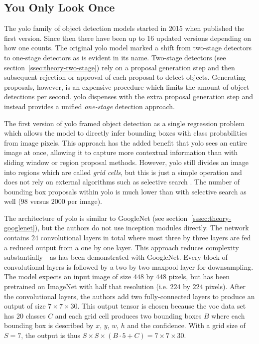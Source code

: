 \documentclass[draft,final]{vutinfth} %
\begin{document}
\subsection{You Only Look Once}
\label{sec:methods-detection}

The \gls{yolo} family of object detection models started in 2015 when
\cite{redmon2016} published the first version. Since then there have
been up to 16 updated versions depending on how one counts. The
original \gls{yolo} model marked a shift from two-stage detectors to
one-stage detectors as is evident in its name. Two-stage detectors
(see section~\ref{ssec:theory-two-stage}) rely on a proposal
generation step and then subsequent rejection or approval of each
proposal to detect objects. Generating proposals, however, is an
expensive procedure which limits the amount of object detections per
second. \gls{yolo} dispenses with the extra proposal generation step
and instead provides a unified \emph{one-stage} detection approach.

The first version of \gls{yolo} \cite{redmon2016} framed object
detection as a single regression problem which allows the model to
directly infer bounding boxes with class probabilities from image
pixels. This approach has the added benefit that \gls{yolo} sees an
entire image at once, allowing it to capture more contextual
information than with sliding window or region proposal
methods. However, \gls{yolo} still divides an image into regions which
are called \emph{grid cells}, but this is just a simple operation and
does not rely on external algorithms such as selective search
\cite{uijlings2013}. The number of bounding box proposals within
\gls{yolo} is much lower than with selective search as well ($98$
versus $2000$ per image).

The architecture of \gls{yolo} is similar to GoogleNet (see
section~\ref{sssec:theory-googlenet}), but the authors do not use
inception modules directly. The network contains $24$ convolutional
layers in total where most three by three layers are fed a reduced
output from a one by one layer. This approach reduces complexity
substantially---as has been demonstrated with GoogleNet. Every block of
convolutional layers is followed by a two by two maxpool layer for
downsampling. The model expects an input image of size $448$ by $448$
pixels, but has been pretrained on ImageNet with half that resolution
(i.e. $224$ by $224$ pixels). After the convolutional layers, the
authors add two fully-connected layers to produce an output of size
$7 \times 7 \times 30$. This output tensor is chosen because the \gls{voc} data
set has $20$ classes $C$ and each grid cell produces two bounding
boxes $B$ where each bounding box is described by $x$, $y$, $w$, $h$
and the confidence. With a grid size of $S = 7$, the output is thus
$S \times S \times (B \cdot 5 + C) = 7 \times 7 \times 30$.
\end{document}
